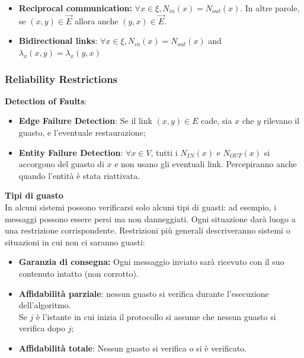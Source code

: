 \begin{itemize}
    \item \textbf{Reciprocal communication:} $\forall x \in \xi, N_{in}(x) =
              N_{out}(x)$. In altre parole, se $(x, y) \in \overrightarrow{E}$ allora anche
          $(y, x) \in \overrightarrow{E}$.
    \item \textbf{Bidirectional links}: $\forall x \in \xi, N_{in}(x) =
              N_{out}(x)$ and $\lambda_x (x, y) = \lambda_x (y,x)$
\end{itemize}

\subsubsection{Reliability Restrictions}
\textbf{Detection of Faults}:

\begin{itemize}
    \item \textbf{Edge Failure Detection}: Se il link $(x, y) \in E$ cade, sia $x$
          che $y$ rilevano il guasto, e l'eventuale restaurazione;
    \item \textbf{Entity Failure Detection}: $\forall x \in  V$, tutti i
          $N_{IN}(x)$ e $N_{OUT}(x)$ si accorgono del guasto di $x$ e non usano gli
          eventuali link. Percepiranno anche quando l'entità è stata riattivata.
\end{itemize}

\textbf{Tipi di guasto}\\
In alcuni sistemi possono verificarsi solo alcuni tipi di guasti: ad esempio, i
messaggi possono essere persi ma non danneggiati. Ogni situazione darà luogo a
una restrizione corrispondente. Restrizioni più generali descriveranno sistemi o
situazioni in cui non ci saranno guasti:

\begin{itemize}
    \item \textbf{Garanzia di consegna:} Ogni messaggio inviato sarà ricevuto con
          il suo contenuto intatto (non corrotto).
    \item \textbf{Affidabilità parziale}: nessun guasto si verifica durante
          l'esecuzione dell'algoritmo.\\
          Se $j$ è l'istante in cui inizia il protocollo si assume che nessun
          guasto si verifica dopo $j$;
    \item \textbf{Affidabilità totale}: Nessun guasto si verifica o si è
          verificato.
\end{itemize}

